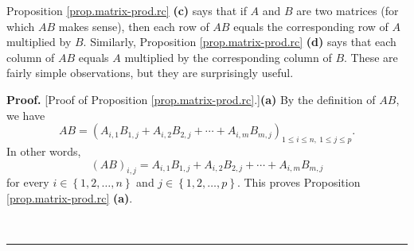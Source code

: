 \documentclass[numbers=enddot,12pt,final,onecolumn,notitlepage]{scrartcl}%
\theoremstyle{definition}
\newenvironment{proof}[1][Proof]{\noindent\textbf{#1.} }{\ \rule{0.5em}{0.5em}}
\begin{document}
Proposition \ref{prop.matrix-prod.rc} \textbf{(c)} says that if $A$ and $B$
are two matrices (for which $AB$ makes sense), then each row of $AB$ equals
the corresponding row of $A$ multiplied by $B$. Similarly, Proposition
\ref{prop.matrix-prod.rc} \textbf{(d)} says that each column of $AB$ equals
$A$ multiplied by the corresponding column of $B$. These are fairly simple
observations, but they are surprisingly useful.

\begin{proof}
[Proof of Proposition \ref{prop.matrix-prod.rc}.]\textbf{(a)} By the
definition of $AB$, we have%
\[
AB=\left(  A_{i,1}B_{1,j}+A_{i,2}B_{2,j}+\cdots+A_{i,m}B_{m,j}\right)  _{1\leq
i\leq n,\ 1\leq j\leq p}.
\]
In other words,%
\begin{equation}
\left(  AB\right)  _{i,j}=A_{i,1}B_{1,j}+A_{i,2}B_{2,j}+\cdots+A_{i,m}B_{m,j}
\label{pf.prop.matrix-prod.rc.1}%
\end{equation}
for every $i\in\left\{  1,2,\ldots,n\right\}  $ and $j\in\left\{
1,2,\ldots,p\right\}  $. This proves Proposition \ref{prop.matrix-prod.rc}
\textbf{(a)}.


\end{proof}
\end{document}

